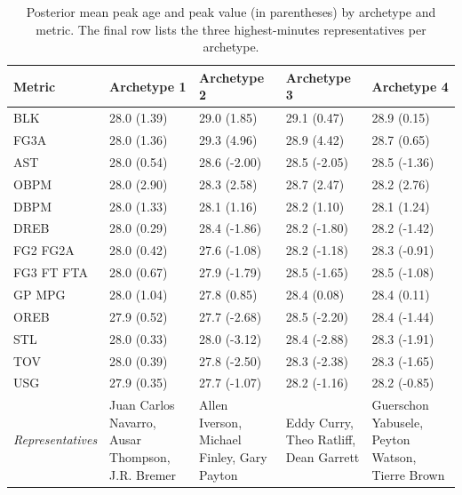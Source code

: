 \begin{table}

\caption{\label{tab:tab:archetype_summary}Posterior mean peak age and peak value (in parentheses) by archetype and metric. The final row lists the three highest-minutes representatives per archetype.}
\centering
\begin{tabular}[t]{lllll}
\toprule
Metric & Archetype 1 & Archetype 2 & Archetype 3 & Archetype 4\\
\midrule
BLK & 28.0 (1.39) & 29.0 (1.85) & 29.1 (0.47) & 28.9 (0.15)\\
FG3A & 28.0 (1.36) & 29.3 (4.96) & 28.9 (4.42) & 28.7 (0.65)\\
AST & 28.0 (0.54) & 28.6 (-2.00) & 28.5 (-2.05) & 28.5 (-1.36)\\
OBPM & 28.0 (2.90) & 28.3 (2.58) & 28.7 (2.47) & 28.2 (2.76)\\
DBPM & 28.0 (1.33) & 28.1 (1.16) & 28.2 (1.10) & 28.1 (1.24)\\
\addlinespace
DREB & 28.0 (0.29) & 28.4 (-1.86) & 28.2 (-1.80) & 28.2 (-1.42)\\
FG2%
FG2A & 28.0 (0.42) & 27.6 (-1.08) & 28.2 (-1.18) & 28.3 (-0.91)\\
FG3%
FT%
\addlinespace
FTA & 28.0 (0.67) & 27.9 (-1.79) & 28.5 (-1.65) & 28.5 (-1.08)\\
GP%
MPG & 28.0 (1.04) & 27.8 (0.85) & 28.4 (0.08) & 28.4 (0.11)\\
OREB & 27.9 (0.52) & 27.7 (-2.68) & 28.5 (-2.20) & 28.4 (-1.44)\\
STL & 28.0 (0.33) & 28.0 (-3.12) & 28.4 (-2.88) & 28.3 (-1.91)\\
\addlinespace
TOV & 28.0 (0.39) & 27.8 (-2.50) & 28.3 (-2.38) & 28.3 (-1.65)\\
USG & 27.9 (0.35) & 27.7 (-1.07) & 28.2 (-1.16) & 28.2 (-0.85)\\
\textit{Representatives} & Juan Carlos Navarro, Ausar Thompson, J.R. Bremer & Allen Iverson, Michael Finley, Gary Payton & Eddy Curry, Theo Ratliff, Dean Garrett & Guerschon Yabusele, Peyton Watson, Tierre Brown\\
\bottomrule
\end{tabular}
\end{table}
